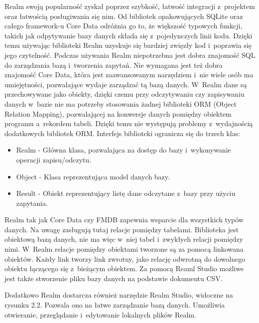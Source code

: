 Realm swoją popularność zyskał poprzez szybkość, łatwość integracji z~projektem oraz łatwością posługiwania się nim. Od bibliotek opakowujących SQLite oraz całego framework-u Core Data odróżnia go to, że większość typowych funkcji, takich jak odpytywanie bazy danych składa się z~pojedynczych linii kodu. Dzięki temu używając biblioteki Realm uzyskuje się bardziej zwięzły kod i~poprawia się jego czytelność. Podczas używania Realm niepotrzebna jest dobra znajomość SQL do zarządzania bazą i~tworzenia zapytań. Nie wymagana jest też dobra znajomość Core Data, która jest zaawansowanym narzędziem i~nie wiele osób ma umiejętności, pozwalające wydaje zarządzać tą bazą danych. W~Realm dane są przechowywane jako obiekty, dzięki czemu przy odczytywaniu czy zapisywaniu danych w~bazie nie ma potrzeby stosowania żadnej biblioteki ORM (Object Relation Mapping), pozwalającej na konwersje danych pomiędzy obiektem programu a~rekordem tabeli. Dzięki temu nie występują problemy z~wydajnością dodatkowych bibliotek ORM. Interfejs biblioteki ogranicza się do trzech klas: 

\begin{itemize}
	\item Realm -  Główna klasa, pozwalająca na dostęp do bazy i~wykonywanie operacji zapisu/odczytu.
	\item Object - Klasa reprezentująca model danych bazy.
	\item Result - Obiekt reprezentujący listę dane odczytane z~bazy przy użyciu zapytania.
\end{itemize}
 \par

Realm tak jak Core Data czy FMDB zapewnia wsparcie dla wszystkich typów danych. Na uwagę zasługują tutaj relacje pomiędzy tabelami. Biblioteka jest obiektową bazą danych, nie ma więc w~niej tabel i~zwykłych relacji pomiędzy nimi. W~Realm relacje pomiędzy obiektami tworzone są za pomocą linkowana obiektów. Każdy link tworzy link zwrotny, jako relację odwrotną do dowolnego obiektu łączącego się z~bieżącym obiektem. Za pomocą Reaml Studio możliwe jest także stworzenie pliku bazy danych na podstawie dokumentu CSV.  \par 

Dodatkowo Realm dostarcza również narzędzie Realm Studio, widoczne na rysunku 2.2. Pozwala ono na łatwe zarządzanie bazą danych. Umożliwia otwieranie, przeglądanie i~edytowanie lokalnych plików Realm.  

